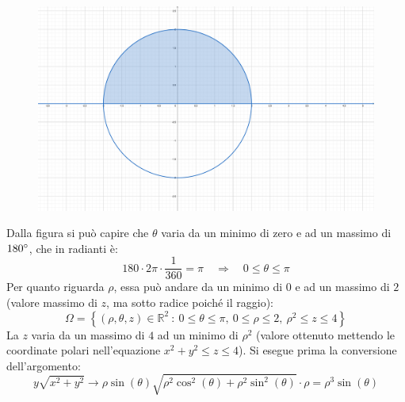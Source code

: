 \documentclass[a4paper]{article}
\begin{document}
	\begin{figure}[!htp]
		\centering
		\includegraphics[width=.6\textwidth]{img/exercise/2023-09-06-A-ex7_2.pdf}
	\end{figure}

	\noindent
	Dalla figura si può capire che $\theta$ varia da un minimo di zero e ad un massimo di $180\degree$, che in radianti è:
	\begin{equation*}
		180 \cdot 2\pi \cdot \dfrac{1}{360} = \pi \hspace{1em} \Longrightarrow \hspace{1em} 0 \le \theta \le \pi
	\end{equation*}
	Per quanto riguarda $\rho$, essa può andare da un minimo di $0$ e ad un massimo di $2$ (valore massimo di $z$, ma sotto radice poiché il raggio):
	\begin{equation*}
		\Omega = \left\{\left(\rho, \theta, z\right) \in \mathbb{R}^{2} \: : \: 0 \le \theta \le \pi, \: 0 \le \rho \le 2, \: \rho^{2} \le z \le 4\right\}
	\end{equation*}
	La $z$ varia da un massimo di $4$ ad un minimo di $\rho^{2}$ (valore ottenuto mettendo le coordinate polari nell'equazione $x^{2}+y^{2}\le z \le 4$). Si esegue prima la conversione dell'argomento:
	\begin{equation*}
		y\sqrt{x^{2}+y^{2}} \rightarrow \rho\sin\left(\theta\right) \sqrt{\rho^{2}\cos^{2}\left(\theta\right) + \rho^{2}\sin^{2}\left(\theta\right)} \cdot \rho = \rho^{3} \sin\left(\theta\right)
	\end{equation*}
\end{document}

